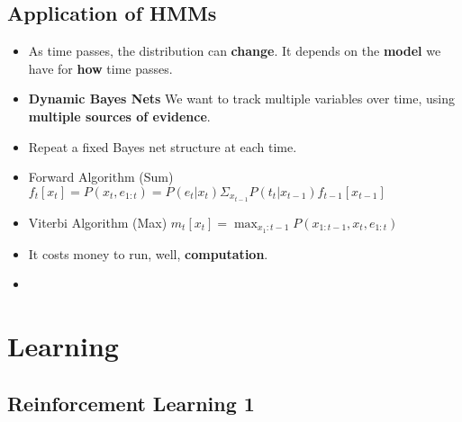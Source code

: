 \documentclass[twocolumn]{article}
\begin{document}
\subsection{Application of HMMs}
\label{sec:application-hmms}

\begin{itemize}
\item As time passes, the distribution can \textbf{change}. It depends
  on the \textbf{model} we have for \textbf{how} time passes.
\item \textbf{Dynamic Bayes Nets} We want to track multiple variables
  over time, using \textbf{multiple sources of evidence}.
\item Repeat a fixed Bayes net structure at each time.
\item Forward Algorithm (Sum)
  $f_{t}[x_{t}]=P(x_{t},e_{1:t})=P(e_{t}|x_{t})\Sigma_{x_{t-1}}P(t_{t}|x_{t-1})f_{t-1}[x_{t-1}]$ 
\item Viterbi Algorithm (Max)
  $m_{t}[x_{t}]=\max_{x_{1}:t-1}P(x_{1:t-1},x_{t},e_{1:t})$
\item It costs money to run, well, \textbf{computation}.
\item 
\end{itemize}


\section{Learning}
\label{sec:learning}


\subsection{Reinforcement Learning 1}
\label{sec:reinf-learn-1}
\end{document}
